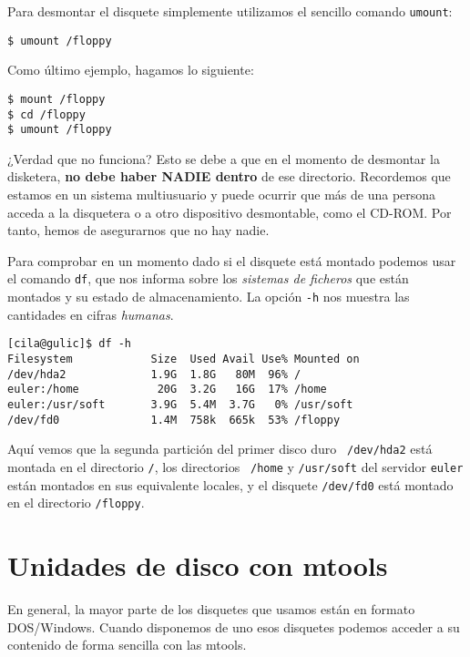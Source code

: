 Para desmontar el disquete simplemente utilizamos el sencillo comando
{\tt umount}:

\begin{verbatim}
$ umount /floppy
\end{verbatim}

Como último ejemplo, hagamos lo siguiente:

\begin{verbatim}
$ mount /floppy
$ cd /floppy
$ umount /floppy
\end{verbatim}

¿Verdad que no funciona? Esto se debe a que en el momento de desmontar
la  disketera, {\bf  no debe  haber NADIE  dentro} de  ese directorio.
Recordemos que estamos en un  sistema multiusuario y puede ocurrir que
más  de una  persona  acceda  a la  disquetera  o  a otro  dispositivo
desmontable, como  el CD-ROM. Por  tanto, hemos de asegurarnos  que no
hay nadie.

Para comprobar en un momento dado  si el disquete está montado podemos
usar el comando {\tt df}, que nos informa sobre los
{\em  sistemas  de  ficheros}  que  están  montados  y  su  estado  de
almacenamiento.  La opción  {\tt  -h} nos  muestra  las cantidades  en
cifras {\em humanas}.

\begin{verbatim}
[cila@gulic]$ df -h
Filesystem            Size  Used Avail Use% Mounted on
/dev/hda2             1.9G  1.8G   80M  96% /
euler:/home            20G  3.2G   16G  17% /home
euler:/usr/soft       3.9G  5.4M  3.7G   0% /usr/soft
/dev/fd0              1.4M  758k  665k  53% /floppy
\end{verbatim}

Aquí  vemos  que la  segunda  partición  del  primer disco  duro  {\tt
/dev/hda2} está montada en el directorio {\tt /}, los directorios {\tt
/home} y  {\tt /usr/soft} del  servidor {\tt euler} están  montados en
sus equivalente locales, y el  disquete {\tt /dev/fd0} está montado en
el directorio {\tt /floppy}.

\section{Unidades de disco con mtools}

En general, la mayor parte de los disquetes que usamos están en
formato DOS/Windows.  Cuando disponemos de uno esos disquetes podemos
acceder a su contenido de forma sencilla con las {\sf
mtools}.

